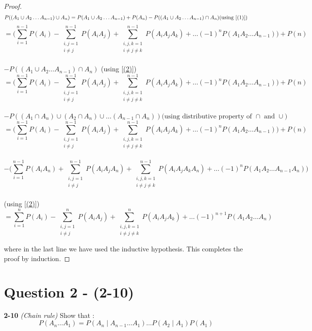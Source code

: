 \documentclass{article}
\begin{document}
\begin{proof}
	$$P((A_1 \cup A_2 \dots A_{n-1}) \cup A_n) = P(A_1 \cup A_2 \dots A_{n-1}) + P(A_n) - P((A_1 \cup A_2 \dots A_{n-1}) \cap A_n) \text{(using \ref{(1)})}$$
	$$= \Big(\sum_{i=1}^{n-1}P(A_i) - \sum_{\substack{i,j =1 \\ i \neq j}}^{n-1}P(A_i A_j) + \sum_{\substack{i,j,k = 1  \\ i \neq j \neq k}}^{n-1}P(A_i A_j A_k) + \dots   (-1)^{n}P(A_1 A_2 \dots A_{n-1})\Big) + P(n)$$ \\  $   - P((A_1 \cup A_2 \dots A_{n-1}) \cap A_n) $  (using \ref{(2)})\\
	$$= \Big(\sum_{i=1}^{n-1}P(A_i) - \sum_{\substack{i,j =1 \\ i \neq j}}^{n-1}P(A_i A_j) + \sum_{\substack{i,j,k = 1  \\ i \neq j \neq k}}^{n-1}P(A_i A_j A_k) + \dots   (-1)^{n}P(A_1 A_2 \dots A_{n-1})\Big) + P(n)$$ \\  $   - P((A_1 \cap A_n) \cup (A_2 \cap A_n) \cup \dots (A_{n-1} \cap A_n)) \text{(using distributive property of $\cap$ and $\cup$)}$ \\
	$$= \Big(\sum_{i=1}^{n-1}P(A_i) - \sum_{\substack{i,j =1 \\ i \neq j}}^{n-1}P(A_i A_j) + \sum_{\substack{i,j,k = 1  \\ i \neq j \neq k}}^{n-1}P(A_i A_j A_k) + \dots   (-1)^{n}P(A_1 A_2 \dots A_{n-1})\Big) + P(n)$$ \\  $$   - \Big(\sum_{i=1}^{n-1}P(A_i  A_n) + \sum_{\substack{i,j =1 \\ i \neq j}}^{n-1}P(A_i A_j A_n) + \sum_{\substack{i,j,k = 1  \\ i \neq j \neq k}}^{n-1}P(A_i A_j A_k A_n) + \dots (-1)^{n}P(A_1 A_2 \dots A_{n-1} A_n)\Big)$$\\  (using \ref{(2)})\\
	$$ =\sum_{i=1}^{n}P(A_i)  -  \sum_{\substack{i,j =1 \\ i \neq j}}^{n}P(A_i A_j)  +  \sum_{\substack{i,j,k = 1 \\ i \neq j \neq k}}^{n}P(A_i A_j A_k)  +  \dots   (-1)^{n+1}P(A_1 A_2 \dots A_n) $$
		
where in the last line we have used the inductive hypothesis. This completes the proof by induction.
\end{proof}
\section{Question 2 - (2-10)}
\label{Q2}
\textbf{2-10} \textit{(Chain rule)} Show that  : \\
\begin{equation*}
	P(A_n \dots A_1) = P(A_n \mid A_{n-1} \dots A_1) \dots P(A_2 \mid A_1)P(A_1)
\end{equation*}
\end{document}
